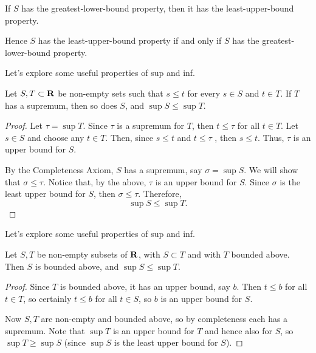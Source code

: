 \begin{corollary}
If $S$ has the greatest-lower-bound property, then it has the least-upper-bound property.

Hence $S$ has the least-upper-bound property if and only if $S$ has the greatest-lower-bound property.
\end{corollary}

Let's explore some useful properties of sup and inf.

\begin{proposition}
Let $S, T \subset \mathbf R$ be non-empty sets such that $s \le t$ for every $s \in S$ and $t \in T$. If $T$ has a supremum, then so does $S$, and $\sup S \le \sup T$.
\end{proposition}

\begin{proof}
Let $\tau = \sup T$. Since $\tau$ is a supremum for $T$, then $t \le \tau$ for all $t \in T$. Let $s \in S$ and choose any $t \in T$. Then, since $s \le t$ and $t \le \tau$ , then $s \le t$. Thus, $\tau$ is an upper bound for $S$. 

By the Completeness Axiom, $S$ has a supremum, say $\sigma = \sup S$. We will show that $\sigma \le \tau$. Notice that, by the above, $\tau$ is an upper bound for $S$. Since $\sigma$ is the least upper bound for $S$, then $\sigma \le \tau$. Therefore,
\[\sup S \le \sup T.\]
\end{proof}

Let's explore some useful properties of sup and inf.

\begin{proposition}
Let $S, T$ be non-empty subsets of $\mathbf R$, with $S \subset T$ and with $T$ bounded above. Then $S$ is bounded above, and $\sup S \le \sup T$.
\end{proposition}
\begin{proof}
Since $T$ is bounded above, it has an upper bound, say $b$. Then $t \le b$ for all $t \in T$, so certainly $t \le b$ for all $t \in S$, so $b$ is an upper bound for $S$.

Now $S, T$ are non-empty and bounded above, so by completeness each has a supremum. Note that $\sup T$ is an upper bound for $T$ and hence also for $S$, so $\sup T \ge \sup S$ (since $\sup S$ is the least upper bound for $S$).
\end{proof}

